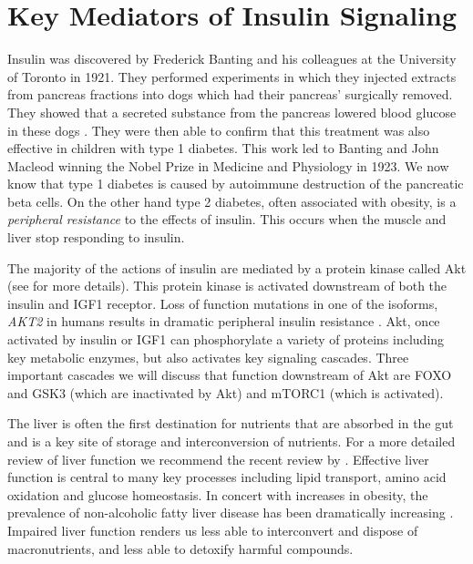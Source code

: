 \documentclass{tufte-handout}
\begin{document}
\section{Key Mediators of Insulin Signaling}

Insulin was discovered by Frederick Banting and his colleagues at the University of Toronto in 1921.  They performed experiments in which they injected extracts from pancreas fractions into dogs which had their pancreas' surgically removed.  They showed that a secreted substance from the pancreas lowered blood glucose in these dogs \citep{Banting1922b}.  They were then able to confirm that this treatment was also effective in children with type 1 diabetes.  This work led to Banting and John Macleod winning the Nobel Prize in Medicine and Physiology in 1923.  We now know that type 1 diabetes is caused by autoimmune destruction of the pancreatic beta cells.  On the other hand type 2 diabetes, often associated with obesity, is a \emph{peripheral resistance} to the effects of insulin.  This occurs when the muscle and liver stop responding to insulin.

The majority of the actions of insulin are mediated by a protein kinase called Akt (see \citep{Manning2007} for more details).  This protein kinase is activated downstream of both the insulin and IGF1 receptor.  Loss of function mutations in one of the isoforms, \textit{AKT2} in humans results in dramatic peripheral insulin resistance \citep{George2004}.  Akt, once activated by insulin or IGF1 can phosphorylate a variety of proteins including key metabolic enzymes, but also activates key signaling cascades.  Three important cascades we will discuss that function downstream of Akt are FOXO and GSK3 (which are inactivated by Akt) and mTORC1 (which is activated).  

  The liver is often the first destination for nutrients that are absorbed in the gut and is a key site of storage and interconversion of nutrients.  For a more detailed review of liver function we recommend the recent review by \citet{Trefts2017}.  Effective liver function is central to many key processes including lipid transport, amino acid oxidation and glucose homeostasis.  In concert with increases in obesity, the prevalence of non-alcoholic fatty liver disease has been dramatically increasing \citep{Hashimoto2011}.  Impaired liver function renders us less able to interconvert and dispose of macronutrients, and less able to detoxify harmful compounds.
\end{document}
